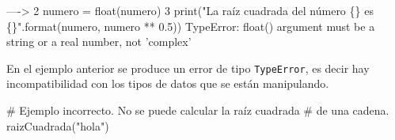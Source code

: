 \documentclass[
  spanish,
  letterpaper,
]{scrbook}
\newenvironment{Shaded}{\begin{snugshade}}{\end{snugshade}}
\newcommand{\CommentTok}[1]{\textcolor[rgb]{0.37,0.37,0.37}{#1}}
\newcommand{\NormalTok}[1]{\textcolor[rgb]{0.00,0.23,0.31}{#1}}
\newcommand{\StringTok}[1]{\textcolor[rgb]{0.13,0.47,0.30}{#1}}
\theoremstyle{definition}
\theoremstyle{remark}
\begin{document}
\begin{Highlighting}
\textcolor{QuartoInternalColor2}{}\textcolor{QuartoInternalColor4}{----> }\textcolor{QuartoInternalColor2}{}\textcolor{QuartoInternalColor4}{2}\textcolor{QuartoInternalColor2}{     numero = }\textcolor{QuartoInternalColor5}{float}\textcolor{QuartoInternalColor2}{}\textcolor{QuartoInternalColor2}{(}\textcolor{QuartoInternalColor2}{}\textcolor{QuartoInternalColor2}{numero}\textcolor{QuartoInternalColor2}{}\textcolor{QuartoInternalColor2}{)}\textcolor{QuartoInternalColor2}{}
\textcolor{QuartoInternalColor2}{}\textcolor{QuartoInternalColor4}{      3}\textcolor{QuartoInternalColor2}{     }\textcolor{QuartoInternalColor5}{print}\textcolor{QuartoInternalColor2}{(}\textcolor{QuartoInternalColor6}{"}\textcolor{QuartoInternalColor2}{}\textcolor{QuartoInternalColor6}{La raíz cuadrada del número }\textcolor{QuartoInternalColor2}{}\textcolor{QuartoInternalColor8}{\{\}}\textcolor{QuartoInternalColor2}{}\textcolor{QuartoInternalColor6}{ es }\textcolor{QuartoInternalColor2}{}\textcolor{QuartoInternalColor8}{\{\}}\textcolor{QuartoInternalColor2}{}\textcolor{QuartoInternalColor6}{"}\textcolor{QuartoInternalColor2}{.format(numero, numero ** }\textcolor{QuartoInternalColor4}{0.5}\textcolor{QuartoInternalColor2}{))}
\textcolor{QuartoInternalColor2}{}\textcolor{QuartoInternalColor1}{TypeError}\textcolor{QuartoInternalColor2}{: float() argument must be a string or a real number, not 'complex'}
\end{Highlighting}

En el ejemplo anterior se produce un error de tipo \texttt{TypeError},
es decir hay incompatibilidad con los tipos de datos que se están
manipulando.

\begin{Shaded}
\begin{Highlighting}[]
\CommentTok{\# Ejemplo incorrecto. No se puede calcular la raíz cuadrada}
\CommentTok{\# de una cadena.}
\NormalTok{raizCuadrada(}\StringTok{"hola"}\NormalTok{)}
\end{Highlighting}
\end{Shaded}
\end{document}
